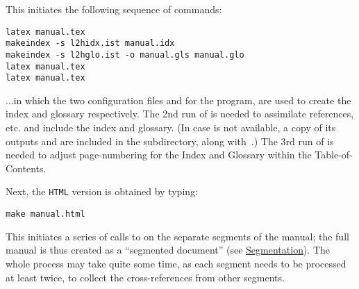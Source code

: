 \begin{itemize}
\noindent
This initiates the following sequence of commands:
\begin{small}
\begin{verbatim}
latex manual.tex
makeindex -s l2hidx.ist manual.idx
makeindex -s l2hglo.ist -o manual.gls manual.glo
latex manual.tex
latex manual.tex
\end{verbatim}
\end{small}
%
%
...in which the two configuration files  and  
for the  program, are used to create the index and glossary respectively.
The 2nd run of  is needed to assimilate references, etc.
and include the index and glossary.\html{\\}%
%
\html{\\}
(In case  is not available, a copy of its outputs  
and  are included in the  subdirectory, 
along with \,.)\html{\\}
The 3rd run of  is needed to adjust page-numbering for the Index 
and Glossary within the Table-of-Contents.

\noindent
Next, the \texttt{HTML} version is obtained by typing:

\begin{small}
\texttt{make manual.html}
\end{small}

\noindent
This initiates a series of calls to \latextohtml{} on the separate
segments of the manual; 
the full manual is thus created as a ``segmented document''
(see \hyperref{a later section}{Section~}{}{Segmentation}).
The whole process may take quite some time, 
as each segment needs to be processed at least twice, 
to collect the cross-references from other segments.


\end{itemize}
